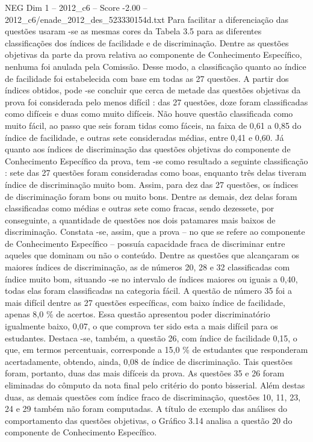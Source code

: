 \begin{textsample}{NEG Dim 1 – 2012\_c6 – Score -2.00 – 2012\_c6/enade\_2012\_des\_523330154d.txt}
Para facilitar a diferenciação das questões usaram -se as mesmas cores da Tabela 3.5 para as diferentes classificações dos índices de facilidade e de discriminação.
Dentre as questões objetivas da parte da prova relativa ao componente de Conhecimento Específico, nenhuma foi anulada pela Comissão.
Desse modo, a classificação quanto ao índice de facilidade foi estabelecida com base em todas as 27 questões.
A partir dos índices obtidos, pode -se concluir que cerca de metade das questões objetivas da prova foi considerada pelo menos difícil : das 27 questões, doze foram classificadas como difíceis e duas como muito difíceis.
Não houve questão classificada como muito fácil, ao passo que seis foram tidas como fáceis, na faixa de 0,61 a 0,85 do índice de facilidade, e outras sete consideradas médias, entre 0,41 e 0,60.
Já quanto aos índices de discriminação das questões objetivas do componente de Conhecimento Específico da prova, tem -se como resultado a seguinte classificação : sete das 27 questões foram consideradas como boas, enquanto três delas tiveram índice de discriminação muito bom.
Assim, para dez das 27 questões, os índices de discriminação foram bons ou muito bons.
Dentre as demais, dez delas foram classificadas como médias e outras sete como fracas, sendo dezessete, por conseguinte, a quantidade de questões nos dois patamares mais baixos de discriminação.
Constata -se, assim, que a prova – no que se refere ao componente de Conhecimento Específico – possuía capacidade fraca de discriminar entre aqueles que dominam ou não o conteúdo.
Dentre as questões que alcançaram os maiores índices de discriminação, as de números 20, 28 e 32 classificadas com índice muito bom, situando -se no intervalo de índices maiores ou iguais a 0,40, todas elas foram classificadas na categoria fácil.
A questão de número 35 foi a mais difícil dentre as 27 questões específicas, com baixo índice de facilidade, apenas 8,0 \% de acertos.
Essa questão apresentou poder discriminatório igualmente baixo, 0,07, o que comprova ter sido esta a mais difícil para os estudantes.
Destaca -se, também, a questão 26, com índice de facilidade 0,15, o que, em termos percentuais, corresponde a 15,0 \% de estudantes que responderam acertadamente, obtendo, ainda, 0,08 de índice de discriminação.
Tais questões foram, portanto, duas das mais difíceis da prova.
As questões 35 e 26 foram eliminadas do cômputo da nota final pelo critério do ponto bisserial.
Além destas duas, as demais questões com índice fraco de discriminação, questões 10, 11, 23, 24 e 29 também não foram computadas.
A título de exemplo das análises do comportamento das questões objetivas, o Gráfico 3.14 analisa a questão 20 do componente de Conhecimento Específico.

\end{textsample}
